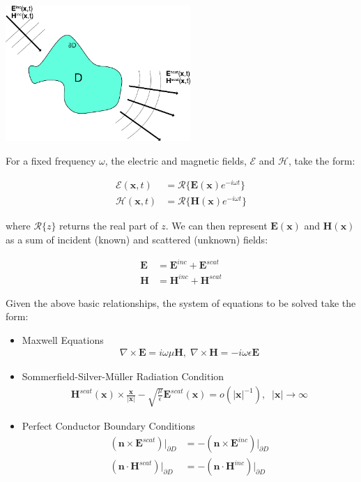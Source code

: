 \documentclass{article}[12pt]
\newcommand{\bvec}[1]{\boldsymbol{#1}}
\begin{document}
	\vspace{0.1in}
	\begin{center}
		\includegraphics[width=7cm]{scatter_problem_pic}
	\end{center}
	
	For a fixed frequency $\omega$, the electric and magnetic fields, $\mathcal{E}$ and $\mathcal{H}$, take the form:
	
	\begin{align*}
	\mathcal{E}(\bvec{x},t) &= \mathcal{R}\lbrace \bvec{E}(\bvec{x}) e^{- i \omega t}\rbrace \\
	\mathcal{H}(\bvec{x},t) &= \mathcal{R}\lbrace \bvec{H}(\bvec{x}) e^{- i \omega t}\rbrace
	\end{align*}
	
	where $\mathcal{R}\lbrace z \rbrace$ returns the real part of $z$. We can then represent $\bvec{E}(\bvec{x})$ and $\bvec{H}(\bvec{x})$ as a sum of incident (known) and scattered (unknown) fields:
	
	\begin{align*}
	\bvec{E} &= \bvec{E}^{inc} + \bvec{E}^{scat} \\
	\bvec{H} &= \bvec{H}^{inc} + \bvec{H}^{scat}
	\end{align*}
	
	
	Given the above basic relationships, the system of equations to be solved take the form:
	
	\begin{itemize}
		\item Maxwell Equations
		\begin{align*}
		\nabla \times \bvec{E} = i \omega \mu \bvec{H}, \;\nabla \times \bvec{H} = - i \omega \epsilon \bvec{E}
		\end{align*}
		\item Sommerfield-Silver-Müller Radiation Condition
		\begin{align*}
		\bvec{H}^{scat}(\bvec{x}) \times \frac{\bvec{x}}{|\bvec{x}|} - \sqrt{\frac{\mu}{\epsilon}} \bvec{E}^{scat}(\bvec{x}) = o(|\bvec{x}|^{-1}), \;\; |\bvec{x}| \rightarrow \infty
		\end{align*}
		\item Perfect Conductor Boundary Conditions
		\begin{align*}
		\left(\bvec{n} \times \bvec{E}^{scat} \right)|_{\partial D} &= -\left( \bvec{n} \times \bvec{E}^{inc} \right)|_{\partial D} \\
		\left(\bvec{n} \cdot \bvec{H}^{scat} \right)|_{\partial D} &= -\left( \bvec{n} \cdot \bvec{H}^{inc} \right)|_{\partial D} 
		\end{align*}
	\end{itemize}
	
\end{document}

